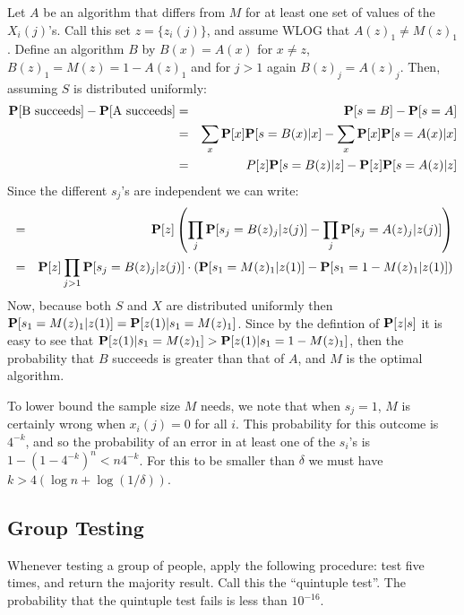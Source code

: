 \documentclass[11pt]{article} \usepackage{amssymb}
\begin{document}
\begin{itemize}
Let $A$ be an algorithm that differs from $M$ for at least one set of values of
the $X_i(j)$'s. Call this set $z=\{z_i(j)\}$, and assume WLOG that $A(z)_1\neq M(z)_1$.
Define an algorithm $B$ by
$B(x)=A(x)$ for $x\neq z$,  $B(z)_1=M(z)=1- A(z)_1$ and for $j>1$ again
$B(z)_j=A(z)_j$. Then, assuming $S$ is distributed uniformly:
\begin{eqnarray*}
\P[\mbox{B succeeds}]-\P[\mbox{A succeeds}] &=&
\P[s=B]-\P[s=A]
\\ &=& \sum_x\P[x]\P[s=B(x)|x]-\sum_x\P[x]\P[s=A(x)|x]
\\ &=& P[z]\P[s=B(z)|z]-\P[z]\P[s=A(z)|z]
\end{eqnarray*}
Since the different $s_j$'s are independent we can write:
\begin{eqnarray*}
 &=& \P[z]\left(\prod_j\P[s_j=B(z)_j|z(j)]-\prod_j\P[s_j=A(z)_j|z(j)]\right)
\\ &=& \P[z]\prod_{j>1}\P[s_j=B(z)_j|z(j)]\cdot\left(\P[s_1=M(z)_1|z(1)]-\P[s_1=1-M(z)_1|z(1)]\right)
\end{eqnarray*}
Now, because both $S$ and $X$ are distributed uniformly then
 $\P[s_1=M(z)_1|z(1)]=\P[z(1)|s_1=M(z)_1]$. Since by the defintion of $\P[z|s]$ it
is easy to see that $\P[z(1)|s_1=M(z)_1]>\P[z(1)|s_1=1-M(z)_1]$, then
the probability that $B$ succeeds is greater than that of $A$, and $M$ is
the optimal algorithm.

To lower bound the sample size $M$ needs, we note that when $s_j=1$, $M$
is certainly wrong when $x_i(j)=0$ for all $i$.
This probability for this outcome is $4^{-k}$,
and so the probability of an
error in at least one of the $s_i$'s is
$1-\left(1-4^{-k}\right)^n<n4^{-k}$. For this to be smaller than $\delta$ we must have
$k>4\left(\log n+\log(1/\delta)\right)$.
\end{itemize}

\subsection{Group Testing}
Whenever testing a group of people, apply the following procedure: test five
times,
and return the majority result. Call this the ``quintuple test''. The
probability that the quintuple test fails is less than $10^{-16}$.
\end{document}

